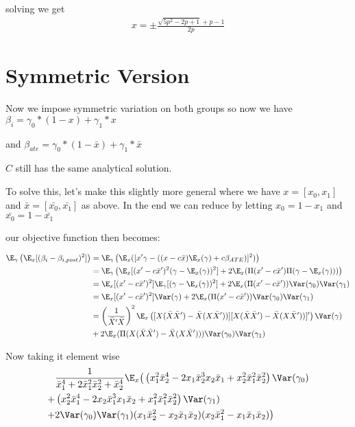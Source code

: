 solving we get 
\begin{align*}
	x = \pm \frac{\sqrt{5 p^2 - 2p + 1} +p -1}{2p}
\end{align*} 




\section{Symmetric Version}
Now we impose symmetric variation on both groups so now we have
$\beta_i = \gamma_0*(1-x)+\gamma_1*x$

and 
$\beta_{ate} = \gamma_0*(1-\bar{x})+\gamma_1*\bar{x}$

$C$ still has the same analytical solution.

To solve this, let's make this slightly more general where we have $x = [x_0, x_1]$ and $\bar{x} = [\bar{x_0}, \bar{x_1}]$ as above. In the end we can reduce by letting $x_0 = 1 - x_1$ and  $\bar{x_0} = 1 - \bar{x_1}$

our objective function then becomes:

\begin{align*}
	\E_{\gamma} \left(\E_{x}[(\beta_i - \beta_{i,post})^2] \right) &= \E_{\gamma} \left( \E_{x}([ x' \gamma  - ((x - c\bar{x}) \E_{x}(\gamma) + c \beta_{ATE})]^2) \right) \\
									 &= \E_{\gamma} \left( \E_{x}[ (x' - c\bar{x}')^2 (\gamma - \E_{x}(\gamma))^2] + 2\E_{x}(\Pi(x' - c\bar{x}') \Pi(\gamma - \E_{x}(\gamma))) \right) \\
									 &= \E_{x}[ (x' - c\bar{x}')^2] \E_{\gamma} [(\gamma - \E_{x}(\gamma))^2 ] + 2\E_{x}(\Pi(x' - c\bar{x}'))\Var(\gamma_0)\Var(\gamma_1) \\
									 &= \E_{x}[ (x' - c\bar{x}')^2] \Var(\gamma) + 2\E_{x}(\Pi(x' - c\bar{x}'))\Var(\gamma_0)\Var(\gamma_1) \\
									 &= \left(\frac{1}{\bar{X}' \bar{X}}\right)^2 
									 \E_{x} \left( [ X (\bar{X} \bar{X}') - \bar{X}(X \bar{X}'))][ X (\bar{X} \bar{X}') - \bar{X}(X \bar{X}'))]' \right) \Var(\gamma) \\
									 &+ 2\E_{x}(\Pi( X (\bar{X} \bar{X}') - \bar{X}(X \bar{X}'))) \Var(\gamma_0)\Var(\gamma_1) \\
\end{align*} 

Now taking it element wise
\begin{align*}
	 &\frac{1}{\bar{x}_1^4 + 2\bar{x}_1^2 \bar{x}_2^2 + \bar{x}_2^4} 
	 \E_{x}\big( \left(x_1^2 \bar{x}_2^4  - 2 x_1 \bar{x}_2^3 x_2 \bar{x}_1 + x_2^2 \bar{x}_1^2 \bar{x}_2^2\right)\Var(\gamma_0) \\
	+ &\left(x_2^2 \bar{x}_1^4  - 2 x_2 \bar{x}_1^3 x_1 \bar{x}_2 + x_1^2 \bar{x}_1^2 \bar{x}_2^2\right)\Var(\gamma_1) \\
	+ & 2 \Var(\gamma_0) \Var(\gamma_1)(x_1 \bar{x}_2^2 - x_2 \bar{x}_1 \bar{x}_2) (x_2 \bar{x}_1^2 - x_1 \bar{x}_1 \bar{x}_2) \big)
\end{align*} 

